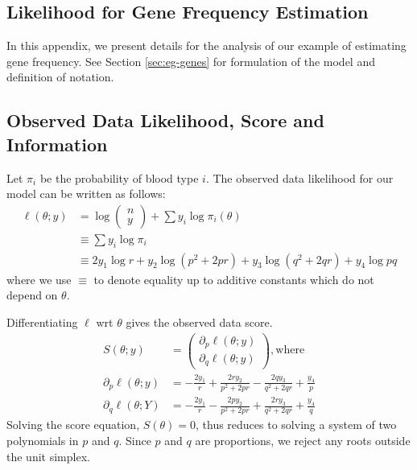\documentclass[11pt, oneside]{article}   	%
\begin{document}
\newpage

\begin{appendices}
    \section{Likelihood for Gene Frequency Estimation}

    In this appendix, we present details for the analysis of our example of estimating gene frequency. See Section \ref{sec:eg-genes} for formulation of the model and definition of notation.

    \subsection{Observed Data Likelihood, Score and Information}

    Let $\pi_i$ be the probability of blood type $i$. The observed data likelihood for our model can be written as follows:
    \begin{align}
        \ell(\theta; y) &= \log \begin{pmatrix} n \\ y \end{pmatrix} + \sum y_i \log \pi_i(\theta)\\
        & \equiv \sum y_i \log \pi_i\\
        &\equiv 2 y_1 \log r + y_2 \log(p^2 + 2pr) + y_3 \log(q^2 + 2qr) + y_4 \log pq
    \end{align}
    where we use $\equiv$ to denote equality up to additive constants which do not depend on $\theta$.

    Differentiating $\ell$ wrt $\theta$ gives the observed data score.
    \begin{align}
        S(\theta; y) &= \begin{pmatrix}
            \partial_p \ell(\theta; y)\\
            \partial_q \ell(\theta; y) 
        \end{pmatrix} \mathrm{, where}\\
        \partial_p \ell(\theta; y) &= - \frac{2 y_1}{r}  + \frac{2r y_2}{p^2 + 2pr}  - \frac{2q y_3}{q^2 + 2qr}  + \frac{y_4}{p} \label{eq:gene_obs_score1}\\
        \partial_q \ell(\theta; Y) &= - \frac{2 y_1}{r}  - \frac{2p y_2}{p^2 + 2pr}  + \frac{2r y_3}{q^2 + 2qr}  + \frac{y_4}{q} \label{eq:gene_obs_score2}
    \end{align}
    Solving the score equation, $S(\theta) = 0$, thus reduces to solving a system of two polynomials in $p$ and $q$. Since $p$ and $q$ are proportions, we reject any roots outside the unit simplex.


\end{appendices}
\end{document}
